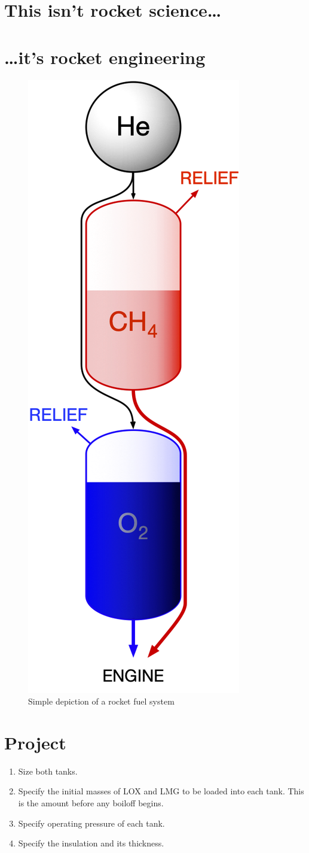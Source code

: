 \documentclass[
]{book}
\providecommand{\tightlist}{%
  \setlength{\itemsep}{0pt}\setlength{\parskip}{0pt}}
\begin{document}
\hypertarget{this-isnt-rocket-science}{%
\section{This isn't rocket science\ldots{}}\label{this-isnt-rocket-science}}

\hypertarget{its-rocket-engineering}{%
\section{\ldots it's rocket engineering}\label{its-rocket-engineering}}

\begin{figure}

{\centering \includegraphics[width=0.25\linewidth]{./figures/rocket-fuel} 

}

\caption{Simple depiction of a rocket fuel system}\label{fig:rocket-fuel}
\end{figure}

\hypertarget{project}{%
\section{Project}\label{project}}

\begin{enumerate}
\def\labelenumi{\arabic{enumi}.}
\tightlist
\item
  Size both tanks.
\item
  Specify the initial masses of LOX and LMG to be loaded into each tank. This is the amount before any boiloff begins.
\item
  Specify operating pressure of each tank.
\item
  Specify the insulation and its thickness.
\end{enumerate}
\end{document}
